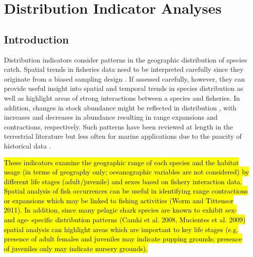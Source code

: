 \documentclass[12pt]{SCreport}
\begin{document}
        
             
        
\section{Distribution Indicator Analyses}
      \subsection{Introduction}

      Distribution indicators consider patterns in the geographic distribution of species catch. Spatial trends in fisheries data need to be interpreted carefully since they originate from a biased sampling design \citep{Walters2003_a}. If assessed carefully, however, they can provide useful insight into spatial and temporal trends in species distribution as well as highlight areas of strong interactions between a species and fisheries. In addition, changes in stock abundance might be reflected in distribution \citep{MacCall1990}, with increases and decreases in abundance resulting in range expansions and contractions, respectively. Such patterns have been reviewed at length in the terrestrial literature \citep{Borregaard2010_a} but less often for marine applications due to the paucity of historical data \citep[but see][]{Worm2011_a}. 
      
\hl{These indicators examine the geographic range of each species and the habitat usage (in terms of geography only; oceanographic variables are not considered) by different life stages (adult/juvenile) and sexes based on fishery interaction data. Spatial analysis of fish occurrences can be useful in identifying range contractions or expansions which may be linked to fishing activities (Worm and Tittensor 2011). In addition, since many pelagic shark species are known to exhibit sex- and age- specific distribution patterns (Camhi et al. 2008, Mucientes et al. 2009) spatial analysis can highlight areas which are important to key life stages (e.g. presence of adult females and juveniles may indicate pupping grounds; presence of juveniles only may indicate nursery grounds).}
      
\end{document}

